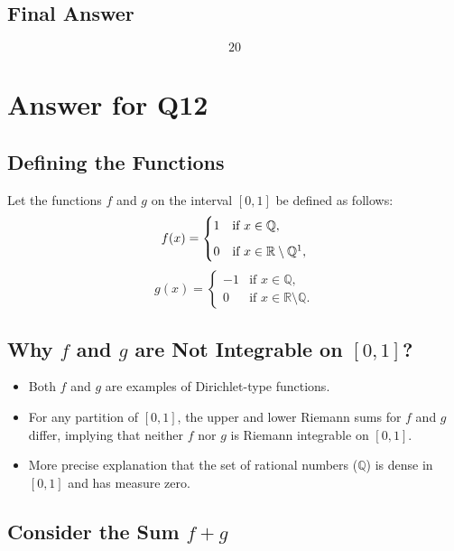 \documentclass{article}
\begin{document}
\subsection*{Final Answer}
\[
\boxed{20}
\]
\section*{Answer for Q12}
\subsection*{Defining the Functions}

Let the functions \( f \) and \( g \) on the interval \([0,1]\) be defined as follows:
\[
f(x) = \begin{cases} 
1 & \text{if } x \in \mathbb{Q}, \\[6pt]
0 & \text{if } x \in \mathbb{R} \setminus \mathbb{Q}\footnotemark,
\end{cases}
\]
\[
g(x) = \begin{cases} 
-1 & \text{if } x \in \mathbb{Q}, \\[6pt]
0 & \text{if } x \in \mathbb{R} \setminus \mathbb{Q}.
\end{cases}
\]

\subsection*{Why \( f \) and \( g \) are Not Integrable on \([0,1]\)?}

\begin{itemize}
    \item Both \( f \) and \( g \) are examples of Dirichlet-type functions.
    \item For any partition of \([0,1]\), the upper and lower Riemann sums for \( f \) and \( g \) differ, implying that neither \( f \) nor \( g \) is Riemann integrable on \([0,1]\).
    \item More precise explanation that the set of rational numbers (\(\mathbb{Q}\)) is dense in \([0,1]\) and has measure zero.
\end{itemize}

\subsection*{Consider the Sum \( f + g \)}
\end{document}
